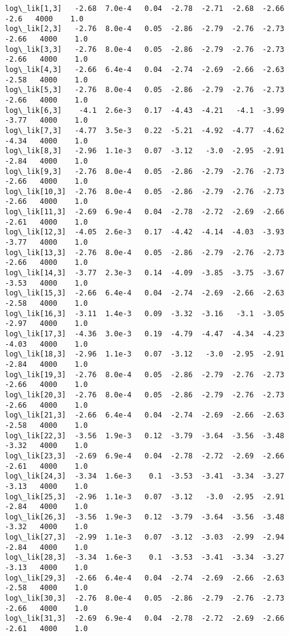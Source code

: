 \documentclass[11pt]{article}
\begin{document}
\begin{Verbatim}[commandchars=\\\{\}]
log\_lik[1,3]   -2.68  7.0e-4   0.04  -2.78  -2.71  -2.68  -2.66   -2.6   4000    1.0
log\_lik[2,3]   -2.76  8.0e-4   0.05  -2.86  -2.79  -2.76  -2.73  -2.66   4000    1.0
log\_lik[3,3]   -2.76  8.0e-4   0.05  -2.86  -2.79  -2.76  -2.73  -2.66   4000    1.0
log\_lik[4,3]   -2.66  6.4e-4   0.04  -2.74  -2.69  -2.66  -2.63  -2.58   4000    1.0
log\_lik[5,3]   -2.76  8.0e-4   0.05  -2.86  -2.79  -2.76  -2.73  -2.66   4000    1.0
log\_lik[6,3]    -4.1  2.6e-3   0.17  -4.43  -4.21   -4.1  -3.99  -3.77   4000    1.0
log\_lik[7,3]   -4.77  3.5e-3   0.22  -5.21  -4.92  -4.77  -4.62  -4.34   4000    1.0
log\_lik[8,3]   -2.96  1.1e-3   0.07  -3.12   -3.0  -2.95  -2.91  -2.84   4000    1.0
log\_lik[9,3]   -2.76  8.0e-4   0.05  -2.86  -2.79  -2.76  -2.73  -2.66   4000    1.0
log\_lik[10,3]  -2.76  8.0e-4   0.05  -2.86  -2.79  -2.76  -2.73  -2.66   4000    1.0
log\_lik[11,3]  -2.69  6.9e-4   0.04  -2.78  -2.72  -2.69  -2.66  -2.61   4000    1.0
log\_lik[12,3]  -4.05  2.6e-3   0.17  -4.42  -4.14  -4.03  -3.93  -3.77   4000    1.0
log\_lik[13,3]  -2.76  8.0e-4   0.05  -2.86  -2.79  -2.76  -2.73  -2.66   4000    1.0
log\_lik[14,3]  -3.77  2.3e-3   0.14  -4.09  -3.85  -3.75  -3.67  -3.53   4000    1.0
log\_lik[15,3]  -2.66  6.4e-4   0.04  -2.74  -2.69  -2.66  -2.63  -2.58   4000    1.0
log\_lik[16,3]  -3.11  1.4e-3   0.09  -3.32  -3.16   -3.1  -3.05  -2.97   4000    1.0
log\_lik[17,3]  -4.36  3.0e-3   0.19  -4.79  -4.47  -4.34  -4.23  -4.03   4000    1.0
log\_lik[18,3]  -2.96  1.1e-3   0.07  -3.12   -3.0  -2.95  -2.91  -2.84   4000    1.0
log\_lik[19,3]  -2.76  8.0e-4   0.05  -2.86  -2.79  -2.76  -2.73  -2.66   4000    1.0
log\_lik[20,3]  -2.76  8.0e-4   0.05  -2.86  -2.79  -2.76  -2.73  -2.66   4000    1.0
log\_lik[21,3]  -2.66  6.4e-4   0.04  -2.74  -2.69  -2.66  -2.63  -2.58   4000    1.0
log\_lik[22,3]  -3.56  1.9e-3   0.12  -3.79  -3.64  -3.56  -3.48  -3.32   4000    1.0
log\_lik[23,3]  -2.69  6.9e-4   0.04  -2.78  -2.72  -2.69  -2.66  -2.61   4000    1.0
log\_lik[24,3]  -3.34  1.6e-3    0.1  -3.53  -3.41  -3.34  -3.27  -3.13   4000    1.0
log\_lik[25,3]  -2.96  1.1e-3   0.07  -3.12   -3.0  -2.95  -2.91  -2.84   4000    1.0
log\_lik[26,3]  -3.56  1.9e-3   0.12  -3.79  -3.64  -3.56  -3.48  -3.32   4000    1.0
log\_lik[27,3]  -2.99  1.1e-3   0.07  -3.12  -3.03  -2.99  -2.94  -2.84   4000    1.0
log\_lik[28,3]  -3.34  1.6e-3    0.1  -3.53  -3.41  -3.34  -3.27  -3.13   4000    1.0
log\_lik[29,3]  -2.66  6.4e-4   0.04  -2.74  -2.69  -2.66  -2.63  -2.58   4000    1.0
log\_lik[30,3]  -2.76  8.0e-4   0.05  -2.86  -2.79  -2.76  -2.73  -2.66   4000    1.0
log\_lik[31,3]  -2.69  6.9e-4   0.04  -2.78  -2.72  -2.69  -2.66  -2.61   4000    1.0

\end{Verbatim}
\end{document}
